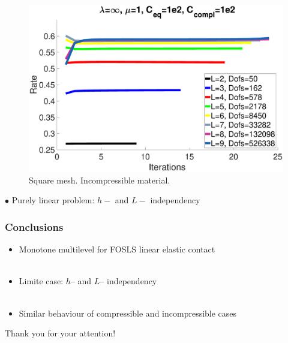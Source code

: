 \documentclass[8pt, oneside]{beamer}   	%
\newcommand{\titlecolor}[1]{\frametitle{\textcolor{dkgrey}{ \textbf{#1}}}}
\begin{document}
\begin{frame}
\begin{figure}[htbp!]
	\quad
		\includegraphics[scale=0.08]{img/SquareRateIncompressible.eps}
	\caption{Square mesh. Incompressible material.}
	\label{ResidualRateSquare}	
	\end{figure}
	$\bullet$ Purely linear problem: $h-$ and $L-$ independency
\end{frame}





\begin{frame}
\titlecolor{Conclusions}
\begin{itemize}
\item Monotone multilevel for FOSLS linear elastic contact 
${}$\\${}$\\
\item Limite case: $h$-- and $L$-- independency
${}$\\${}$\\
\item Similar behaviour of compressible and incompressible cases
\end{itemize}
\end{frame}




\begin{frame}
\centering
\huge
Thank you for your attention!
\end{frame}

\begin{frame}
\end{frame}
\begin{frame}
\end{frame}
\end{document}
